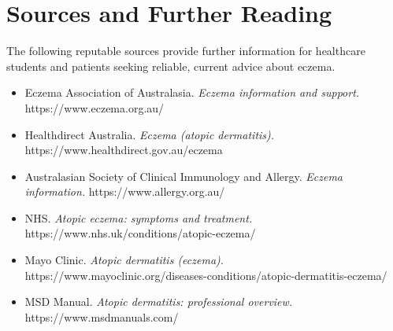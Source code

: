 \section*{Sources and Further Reading}
The following reputable sources provide further information for healthcare students and patients seeking reliable, current advice about eczema.
\begin{itemize}
    \item Eczema Association of Australasia. \textit{Eczema information and support.} https://www.eczema.org.au/
    \item Healthdirect Australia. \textit{Eczema (atopic dermatitis).} https://www.healthdirect.gov.au/eczema
    \item Australasian Society of Clinical Immunology and Allergy. \textit{Eczema information.} https://www.allergy.org.au/
    \item NHS. \textit{Atopic eczema: symptoms and treatment.} https://www.nhs.uk/conditions/atopic-eczema/
    \item Mayo Clinic. \textit{Atopic dermatitis (eczema).} https://www.mayoclinic.org/diseases-conditions/atopic-dermatitis-eczema/
    \item MSD Manual. \textit{Atopic dermatitis: professional overview.} https://www.msdmanuals.com/
\end{itemize}
